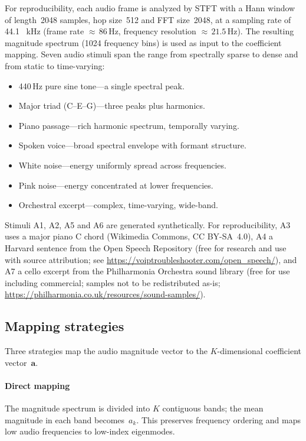 \documentclass[]{interact}
\theoremstyle{plain}
\theoremstyle{definition}
\theoremstyle{remark}
\begin{document}
For reproducibility, each audio frame is analyzed by STFT with a Hann window of length~2048 samples, hop size~512 and FFT size~2048, at a sampling rate of 44.1 \, kHz (frame rate ${\approx}\,86$\,Hz, frequency resolution ${\approx}\,21.5$\,Hz). The resulting magnitude spectrum (1024 frequency bins) is used as input to the coefficient mapping. Seven audio stimuli span the range from spectrally sparse to dense and from static to time-varying:
\begin{itemize}
\item[\textbf{A1.}] 440\,Hz pure sine tone---a single spectral peak.
\item[\textbf{A2.}] Major triad (C--E--G)---three peaks plus harmonics.
\item[\textbf{A3.}] Piano passage---rich harmonic spectrum, temporally varying.
\item[\textbf{A4.}] Spoken voice---broad spectral envelope with formant structure.
\item[\textbf{A5.}] White noise---energy uniformly spread across frequencies.
\item[\textbf{A6.}] Pink noise---energy concentrated at lower frequencies.
\item[\textbf{A7.}] Orchestral excerpt---complex, time-varying, wide-band.
\end{itemize}
Stimuli A1, A2, A5 and A6 are generated synthetically. For reproducibility, A3 uses a major piano C chord (Wikimedia Commons, CC BY-SA~4.0), A4 a Harvard sentence from the Open Speech Repository (free for research and use with source attribution; see \url{https://voiptroubleshooter.com/open_speech/}), and A7 a cello excerpt from the Philharmonia Orchestra sound library (free for use including commercial; samples not to be redistributed as-is; \url{https://philharmonia.co.uk/resources/sound-samples/}).

\subsection{Mapping strategies}

Three strategies map the audio magnitude vector to the $K$-dimensional coefficient vector~$\mathbf{a}$.

\paragraph{Direct mapping}
The magnitude spectrum is divided into $K$ contiguous bands; the mean magnitude in each band becomes~$a_k$. This preserves frequency ordering and maps low audio frequencies to low-index eigenmodes.
\end{document}

